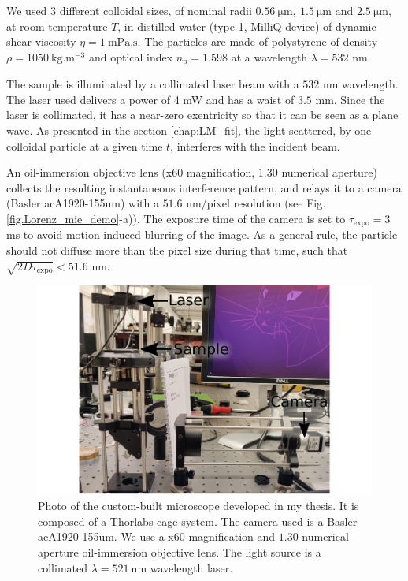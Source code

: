 We used 3 different colloidal sizes, of nominal radii $0.56 ~ \mathrm{\mu m}, ~ 1.5 ~ \mathrm{\mu m} \text{ and } 2.5 ~ \mathrm{\mu m} $, at room temperature $T$, in distilled water (type 1, MilliQ device) of dynamic shear viscosity $\eta = 1 ~ \mathrm{mPa.s}$. The particles are made of polystyrene of density $\rho = 1050  ~\mathrm{kg.m^{-3}}$ and optical index $n_\mathrm{p} = 1.598$ at a wavelength $\lambda = 532$ nm.

The sample is illuminated by a collimated laser beam with a $532$ nm wavelength. The laser used delivers a power of 4 mW and has a waist of $3.5$ mm. Since the laser is collimated, it has a near-zero exentricity so that it can be seen as a plane wave. As presented in the section \ref{chap:LM_fit}, the light scattered, by one colloidal particle at a given time $t$, interferes with the incident beam. 

An oil-immersion objective lens (x60 magnification, $1.30$ numerical aperture) collects the resulting instantaneous interference pattern, and relays it to a camera (Basler acA1920-155um) with a $51.6$ nm/pixel resolution (see Fig.\ref{fig.Lorenz_mie_demo}-a)). The exposure time of the camera is set to $\tau_{\mathrm{expo}} = 3$ ms to avoid motion-induced blurring of the image. As a general rule, the particle should not diffuse more than the pixel size during that time, such that $\sqrt{2D\tau_{\mathrm{expo}} }< 51.6$ nm.

\begin{figure}[!ht]
	\centering
	\includegraphics{02_body/chapter2/images/figures_setup/photo_setup.pdf}
	\caption{Photo of the custom-built microscope developed in my thesis. It is composed of a Thorlabs cage system. The camera used is a Basler acA1920-155um. We use a x60 magnification and $1.30$ numerical aperture oil-immersion objective lens. The light source is a collimated  $ \lambda = 521 ~ \mathrm{n m}$ wavelength laser.}
	\label{fig:picture}
\end{figure}

